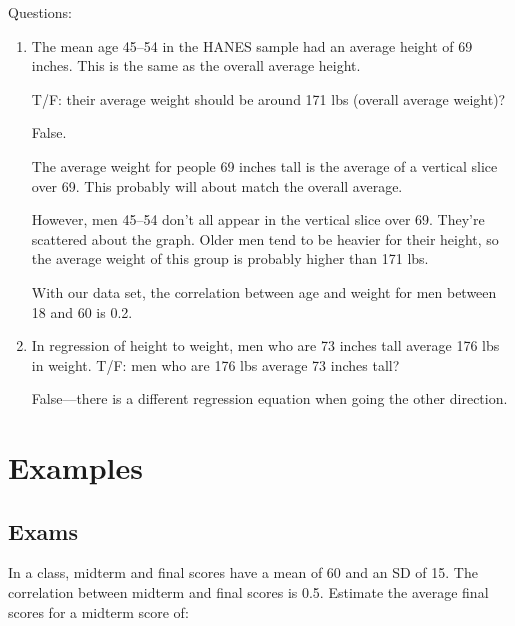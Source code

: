 \documentclass[letterpaper, landscape]{exam}
\begin{document}
  Questions:
  \begin{enumerate}
    \item The mean age 45--54 in the HANES sample had an average height of 69
      inches.  This is the same as the overall average height.

      T/F\@: their average weight should be around 171 lbs (overall average
      weight)?

      \begin{solution}
        False.  
        
        The average weight for people 69 inches tall is the average of a
        vertical slice over 69.  This probably will about match the overall
        average.

        However, men 45--54 don't all appear in the vertical slice over 69.
        They're scattered about the graph.  Older men tend to be heavier for
        their height, so the average weight of this group is probably higher
        than 171 lbs.

        With our data set, the correlation between age and weight for men
        between 18 and 60 is 0.2.

      \end{solution}

    \item In regression of height to weight, men who are 73 inches tall average
      176 lbs in weight. T/F\@: men who are 176 lbs average 73 inches tall?

      \begin{solution}
        False---there is a different regression equation when going the other direction.
      \end{solution}

  \end{enumerate}

  \section{Examples}
  
  \subsection{Exams} %
  
  In a class, midterm and final scores have a mean of 60 and an SD of 15.  The correlation
  between midterm and final scores is 0.5.  Estimate the average final scores for a midterm
  score of:
\end{document}
